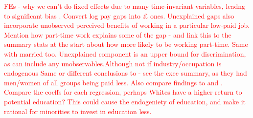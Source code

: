 \documentclass[class=article, crop=false]{standalone}
\begin{document}
\textcolor{red}{FEs - why we can't do fixed effects due to many time-invariant variables, leadng to significant bias \citep{Heitmueller}. Convert log pay gaps into £ ones. Unexplained gaps also incorporate unobserved perceived benefits of working in a particular low-paid job.
Mention how part-time work explains some of the gap - and link this to the summary stats at the start about how more likely to be working part-time. Same with married too.
Unexplained component is an upper bound for discrimination, as can include any unobservables.Although not if industry/occupation is endogenous
Same or different conclusions to \citep{Longhi2} - see the exec summary, as they had men/women of all groups being paid less.
Also compare findings to \citep{Shields} and \citep{ONSe}. Compare the coeffs for each regression, perhaps Whites have a higher return to potential education? This could cause the endogeniety of education, and make it rational for minorities to invest in education less.}


\ifstandalone

\fi
\end{document}
